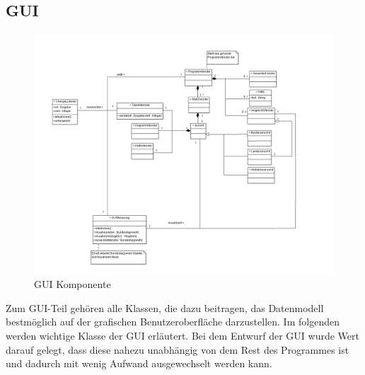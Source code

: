 \documentclass[12pt,a4paper,titlepage]{article}
\begin{document}
\subsection{GUI}
\begin{figure}[!ht]
\includegraphics[scale=0.4]{GUI-Abschnitt.png} \caption{GUI Komponente} 
\end{figure}

Zum GUI-Teil gehören alle Klassen, die dazu beitragen, das Datenmodell bestmöglich auf der grafischen Benutzeroberfläche darzustellen. Im folgenden werden wichtige Klasse der GUI erläutert. Bei dem Entwurf der GUI wurde Wert darauf gelegt, dass diese nahezu unabhängig von dem Rest des Programmes ist und dadurch mit wenig Aufwand ausgewechselt werden kann.
\end{document}
